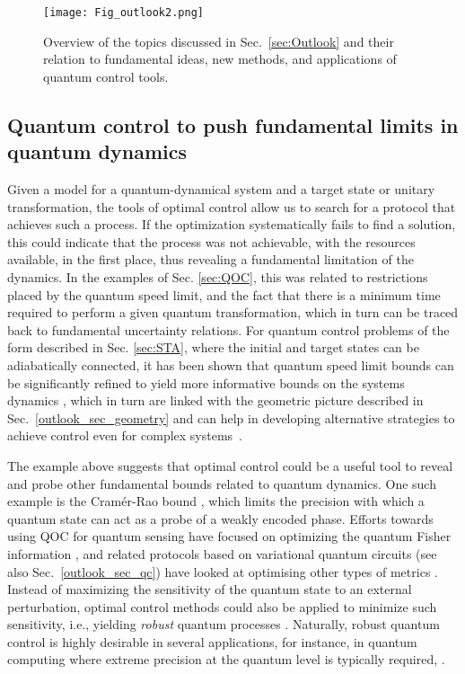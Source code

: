 \begin{figure}[h]
\texttt{[image: Fig\_outlook2.png]}
\caption{Overview of the topics discussed in Sec.~\ref{sec:Outlook} and their relation to fundamental ideas, new methods, and applications of quantum control tools.}
\end{figure}

\subsection{Quantum control to push fundamental limits in quantum dynamics}
Given a model for a quantum-dynamical system and a target state or unitary transformation, the tools of optimal control allow us to search for a protocol that achieves such a process. If the optimization systematically fails to find a solution, this could indicate that the process was not achievable, with the resources available, in the first place, thus revealing a fundamental limitation of the dynamics. In the examples of Sec. \ref{sec:QOC}, this was related to restrictions placed by the quantum speed limit, and the fact that there is a minimum time required to perform a given quantum transformation, which in turn can be traced back to fundamental uncertainty relations. For quantum control problems of the form described in Sec. \ref{sec:STA}, where the initial and target states can be adiabatically connected, it has been shown that quantum speed limit bounds can be significantly refined to yield more informative bounds on the systems dynamics \cite{mandelstam_45,fleming_73,bhattacharyya1983, anandan_90,margolus_98, bukov2019geometric,FunoPRL2017}, which in turn are linked with the geometric picture described in Sec.~\ref{outlook_sec_geometry} and can help in developing alternative strategies to achieve control even for complex systems~\cite{Balducci2}.

The example above suggests that optimal control could be a useful tool to reveal and probe other fundamental bounds related to quantum dynamics. One such example is the Cram\'er-Rao bound \cite{pezze2018}, which limits the precision with which a quantum state can act as a probe of a weakly encoded phase. Efforts towards using QOC for quantum sensing have focused on optimizing the quantum Fisher information \cite{pang2017,liu2017,lin2021,Gietka2021}, and related protocols based on variational quantum circuits (see also Sec.~\ref{outlook_sec_qc}) have looked at optimising other types of metrics \cite{kaubruegger2021}. Instead of maximizing the sensitivity of the quantum state to an external perturbation, optimal control methods could also be applied to minimize such sensitivity, i.e., yielding \textit{robust} quantum processes \cite{poggi2023_urc}. Naturally, robust quantum control is highly desirable in several applications, for instance, in quantum computing where extreme precision at the quantum level is typically required, .


